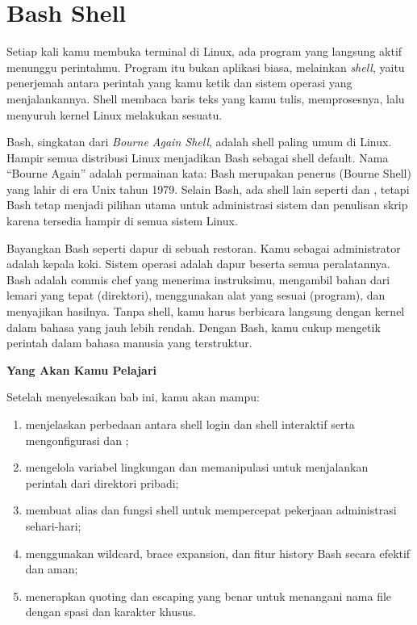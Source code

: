 
\chapter{Bash Shell}
\label{ch:bash-shell-basic}

Setiap kali kamu membuka terminal di Linux, ada program yang langsung
aktif menunggu perintahmu. Program itu bukan aplikasi biasa, melainkan
\textit{shell}, yaitu penerjemah antara perintah yang kamu ketik dan
sistem operasi yang menjalankannya. Shell membaca baris teks yang kamu
tulis, memprosesnya, lalu menyuruh kernel Linux melakukan sesuatu.

Bash, singkatan dari \textit{Bourne Again Shell}, adalah shell paling
umum di Linux. Hampir semua distribusi Linux menjadikan Bash sebagai
shell default. Nama ``Bourne Again'' adalah permainan kata: Bash
merupakan penerus  (Bourne Shell) yang lahir di era Unix tahun
1979. Selain Bash, ada shell lain seperti  dan ,
tetapi Bash tetap menjadi pilihan utama untuk administrasi sistem dan
penulisan skrip karena tersedia hampir di semua sistem Linux.

Bayangkan Bash seperti dapur di sebuah restoran. Kamu sebagai
administrator adalah kepala koki. Sistem operasi adalah dapur beserta
semua peralatannya. Bash adalah commis chef yang menerima instruksimu,
mengambil bahan dari lemari yang tepat (direktori), menggunakan alat
yang sesuai (program), dan menyajikan hasilnya. Tanpa shell, kamu harus
berbicara langsung dengan kernel dalam bahasa yang jauh lebih rendah.
Dengan Bash, kamu cukup mengetik perintah dalam bahasa manusia yang
terstruktur.

\textbf{Yang Akan Kamu Pelajari}

Setelah menyelesaikan bab ini, kamu akan mampu:

\begin{enumerate}
    \item menjelaskan perbedaan antara shell login dan shell interaktif serta
          mengonfigurasi  dan ;
    \item mengelola variabel lingkungan dan memanipulasi  untuk
          menjalankan perintah dari direktori pribadi;
    \item membuat alias dan fungsi shell untuk mempercepat pekerjaan
          administrasi sehari-hari;
    \item menggunakan wildcard, brace expansion, dan fitur history Bash
          secara efektif dan aman;
    \item menerapkan quoting dan escaping yang benar untuk menangani
          nama file dengan spasi dan karakter khusus.
\end{enumerate}

